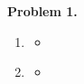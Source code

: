 \noindent \textbf{Problem 1. } \lipsum[1]

\begin{enumerate}[label=\textbf{\alph*.}, wide, labelindent=0pt] %

    \item \emph{\lipsum[1]}
	
	    \begin{itemize} %
	        \item[] \lipsum[1]
	    \end{itemize}
	
	\item \emph{\lipsum[1]}

	    \begin{itemize} %
	        \item[] \lipsum[1]
	    \end{itemize}
\end{enumerate}

\newpage

	